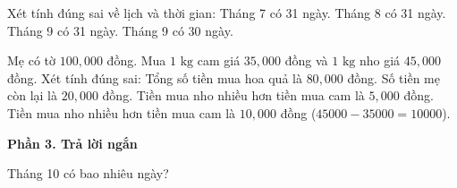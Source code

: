 \begin{ex} %
Xét tính đúng sai về lịch và thời gian:
\choiceTF
{\True Tháng 7 có 31 ngày.}
{\True Tháng 8 có 31 ngày.}
{Tháng 9 có 31 ngày.}
{\True Tháng 9 có 30 ngày.}
\end{ex}

\begin{ex} %
Mẹ có tờ $100,000$ đồng. Mua $1\text{ kg}$ cam giá $35,000$ đồng và $1\text{ kg}$ nho giá $45,000$ đồng. Xét tính đúng sai:
\choiceTF
{\True Tổng số tiền mua hoa quả là $80,000$ đồng.}
{\True Số tiền mẹ còn lại là $20,000$ đồng.}
{Tiền mua nho nhiều hơn tiền mua cam là $5,000$ đồng.}
{\True Tiền mua nho nhiều hơn tiền mua cam là $10,000$ đồng ($45000 - 35000 = 10000$).}
\end{ex}

\textbf{Phần 3. Trả lời ngắn}

\begin{ex} %
Tháng 10 có bao nhiêu ngày?
\end{ex}

